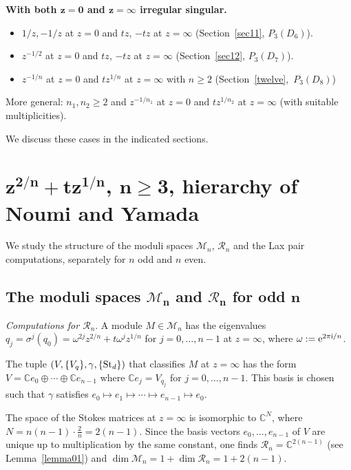 \documentclass[10pt,a4paper]{amsart}
\numberwithin{equation}{section}
\begin{document}
{\bf With both $\boldsymbol{z=0}$ and $\boldsymbol{z=\infty}$ irregular singular.}
\begin{itemize}\itemsep=0pt
\item $1/z,-1/z$ at $z=0$ and $tz$, $-tz$ at $z=\infty$ (Section~\ref{sec11}, $P_3(D_6)$).
\item $z^{-1/2}$ at $z=0$ and $tz$, $-tz$ at $z=\infty$ (Section~\ref{sec12}, $P_3(D_7)$).
\item $z^{-1/n}$ at $z=0$ and $tz^{1/n}$ at $z=\infty$ with $n\geq 2$ (Section~\ref{twelve},\, $P_3(D_8)$)
\end{itemize}

More general: $n_1,n_2\geq 2$ and $z^{-1/n_1}$ at $z=0$ and $tz^{1/n_2}$ at $z=\infty$
 (with suitable multiplicities).

We discuss these cases in the indicated sections.

\section[n-th root of z squared plus t times n-th root of z, hierarchy of Noumi and Yamada]{$\boldsymbol{z^{2/n}+tz^{1/n}}$, $\boldsymbol{n\geq 3}$, hierarchy of Noumi and Yamada}\label{two}
We study the structure of the moduli spaces $\mathcal{M}_n$, $\mathcal{R}_n$ and the Lax pair
computations, separately for $n$ odd and $n$ even.

\subsection[The moduli spaces M\_n and R\_n for odd n]{The moduli spaces $\boldsymbol{\mathcal{M}_n}$ and $\boldsymbol{\mathcal{R}_n}$ for odd $\boldsymbol{n}$}\label{2.1}

 {\it Computations for $\mathcal{R}_n$}.
 A module $M\in \mathcal{M}_n$ has the eigenvalues $q_j=\sigma ^j(q_0)=\omega^{2j}z^{2/n}+t\omega ^jz^{1/n}$ for $j=0,\dots ,n-1$
at $z=\infty$, where $\omega:={\rm e}^{2\pi {\rm i}/n}$.

The tuple $(V,\{V_q\},\gamma,\{{\rm St}_d\})$ that classifies $M$ at $z=\infty$
has the form $V=\mathbb{C}e_0\oplus \cdots \oplus \mathbb{C}e_{n-1}$ where $\mathbb{C}e_j=V_{q_j}$ for
$j=0,\dots , n-1$. This basis is chosen such that
 $\gamma$ satisfies $e_0\mapsto e_1\mapsto \cdots \mapsto e_{n-1}\mapsto e_0$.

 The space of the Stokes matrices at $z=\infty$ is isomorphic to $\mathbb{C}^{N}$, where $N=n(n-1)\cdot \frac{2}{n}=2(n-1)$.
 Since the basis vectors $e_0,\dots , e_{n-1}$ of $V$ are unique up to multiplication by the same constant, one finds $\mathcal{R}_n=\mathbb{C}^{2(n-1)}$ (see Lemma~\ref{lemma01}) and $\dim \mathcal{M}_n=1+\dim \mathcal{R}_n=1+2(n-1)$.
\end{document}
